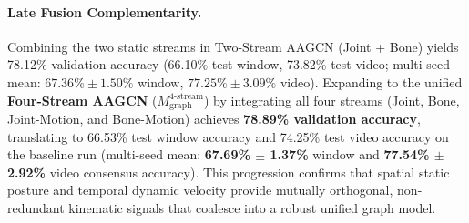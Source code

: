 \documentclass[preprint,12pt]{elsarticle}
\begin{document}
\paragraph{Late Fusion Complementarity.} Combining the two static streams in Two-Stream AAGCN (Joint + Bone) yields 78.12\% validation accuracy (66.10\% test window, 73.82\% test video; multi-seed mean: $67.36\% \pm 1.50\%$ window, $77.25\% \pm 3.09\%$ video). Expanding to the unified \textbf{Four-Stream AAGCN} ($M_{\text{graph}}^{\text{4-stream}}$) by integrating all four streams (Joint, Bone, Joint-Motion, and Bone-Motion) achieves \textbf{78.89\% validation accuracy}, translating to 66.53\% test window accuracy and 74.25\% test video accuracy on the baseline run (multi-seed mean: \textbf{67.69\% $\pm$ 1.37\%} window and \textbf{77.54\% $\pm$ 2.92\%} video consensus accuracy). This progression confirms that spatial static posture and temporal dynamic velocity provide mutually orthogonal, non-redundant kinematic signals that coalesce into a robust unified graph model.

\begin{table}[!t]
\centering
\caption{Multi-stream spatial-temporal graph kinematic streams with SkelGym-Aug across validation and held-out test partitions.}
\label{tab:table4}
\end{table}
\end{document}

